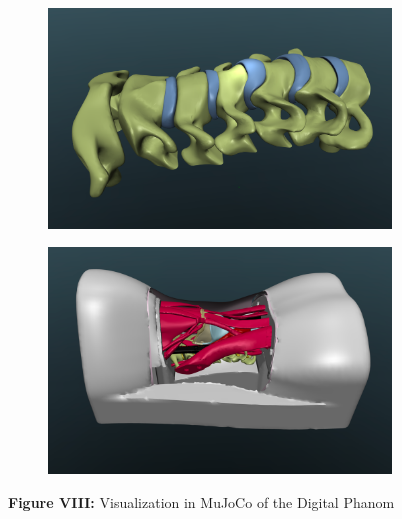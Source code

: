 \documentclass[a4paper, 12pt]{article}
\begin{document}
\begin{figure}[h!]{}
\begin{subfigure}[t]{0.45\textwidth}
\includegraphics[width=\textwidth]{Figures/fig08e.pdf}
           \label{fig:fig08e}
    \end{subfigure}
    \begin{subfigure}[t]{0.5\textwidth}
    \includegraphics[width=\textwidth]{Figures/fig08f.pdf}
           \label{fig:fig04f}
    \end{subfigure}
    \caption*{\textbf{Figure VIII:} Visualization in MuJoCo of the Digital Phanom}
    \label{fig:fig08}
   \end{figure}
\clearpage
\end{document}
